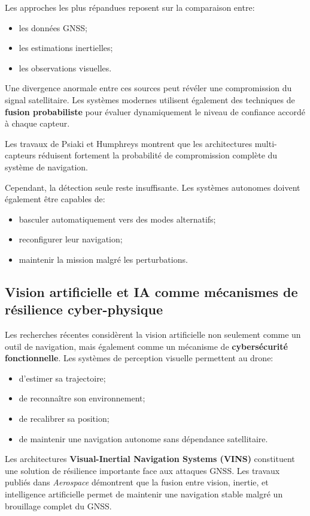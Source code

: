 \documentclass[12pt, a4paper, twoside, openright]{report}
\begin{document}
Les approches les plus répandues reposent sur la comparaison entre:
\begin{itemize}
    \item les données GNSS;
    \item les estimations inertielles;
    \item les observations visuelles.
\end{itemize}

Une divergence anormale entre ces sources peut révéler une compromission du signal satellitaire. Les systèmes modernes utilisent également des techniques de \textbf{fusion probabiliste} pour évaluer dynamiquement le niveau de confiance accordé à chaque capteur.

Les travaux de Psiaki et Humphreys \cite{psiaki2016gnss} montrent que les architectures multi-capteurs réduisent fortement la probabilité de compromission complète du système de navigation.

Cependant, la détection seule reste insuffisante. Les systèmes autonomes doivent également être capables de:
\begin{itemize}
    \item basculer automatiquement vers des modes alternatifs;
    \item reconfigurer leur navigation;
    \item maintenir la mission malgré les perturbations.
\end{itemize}

\subsection{Vision artificielle et IA comme mécanismes de résilience cyber-physique}
Les recherches récentes considèrent la vision artificielle non seulement comme un outil de navigation, mais également comme un mécanisme de \textbf{cybersécurité fonctionnelle}. Les systèmes de perception visuelle permettent au drone:
\begin{itemize}
    \item d’estimer sa trajectoire;
    \item de reconnaître son environnement;
    \item de recalibrer sa position;
    \item de maintenir une navigation autonome sans dépendance satellitaire.
\end{itemize}

Les architectures \textbf{Visual-Inertial Navigation Systems (VINS)} constituent une solution de résilience importante face aux attaques GNSS. Les travaux publiés dans \textit{Aerospace} \cite{aerospace2022vins} démontrent que la fusion entre vision, inertie, et intelligence artificielle permet de maintenir une navigation stable malgré un brouillage complet du GNSS.
\end{document}
